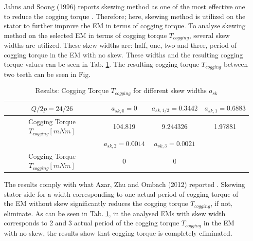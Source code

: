 \documentclass [a4 paper, 11pt, titlepage] {article}
\begin{document}
	Jahns and Soong (1996) reports skewing method as one of the most effective one to reduce the cogging torque \cite{jahns_pulsating_1996}. Therefore; here, skewing method is utilized on the stator to further improve the EM in terms of cogging torque. To analyse skewing method on the selected EM in terms of cogging torque $T_{cogging}$, several skew widths are utilized. These skew widths are: half, one, two and three, period of cogging torque in the EM with no skew. These widths and the resulting cogging torque values can be seen in Tab. \ref{tab:resultslvl2}. The resulting cogging torque $T_{cogging}$ between two teeth can be seen in Fig. 
	
	\begin{table}[h]
		\begin{center}
			\begin{tabular}{c|c|c|c}
				$Q/2p=24/26$ & $a_{sk,0}=0$ & $a_{sk,1/2}=0.3442$ & $a_{sk,1}=0.6883$ \\
				\hline
				Cogging Torque $T_{cogging} [mNm]$ & 104.819 & 9.244326 & 1.97881 \\
				\hline\hline
				 & $a_{sk,2}=0.0014$ & $a_{sk,3}=0.0021$ \\
				\hline
				Cogging Torque $T_{cogging} [mNm]$ & 0 & 0\\
			\end{tabular}
		\end{center}
		\caption{Results: Cogging Torque $T_{cogging}$ for different skew widths $a_{sk}$}
		\label{tab:resultslvl2}
	\end{table}
	
	The results comply with what Azar, Zhu and Ombach (2012) reported \cite{azar_influence_2012}. Skewing stator side for a width corresponding to one actual period of cogging torque of the EM without skew significantly reduces the cogging torque $T_{cogging}$, if not, eliminate. As can be seen in Tab. \ref{tab:resultslvl2}, in the analysed EMs with skew width corresponds to 2 and 3 actual period of the cogging torque $T_{cogging}$ in the EM with no skew, the results show that cogging torque is completely eliminated.
	
\end{document}
